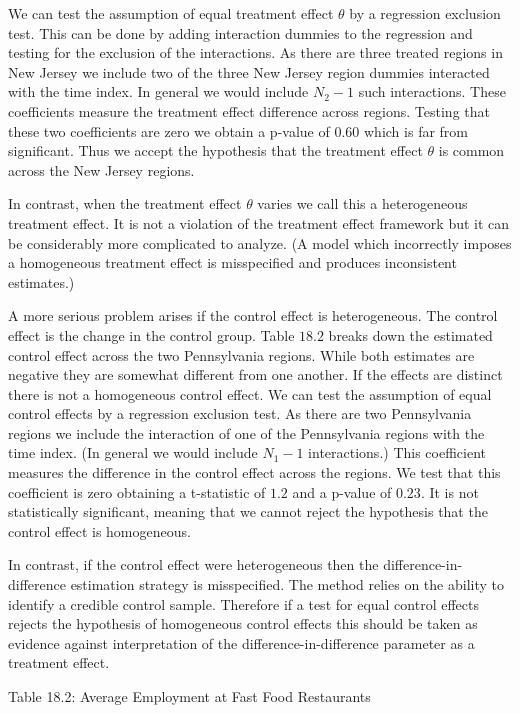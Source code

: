 \documentclass[10pt]{article}
\begin{document}
We can test the assumption of equal treatment effect $\theta$ by a regression exclusion test. This can be done by adding interaction dummies to the regression and testing for the exclusion of the interactions. As there are three treated regions in New Jersey we include two of the three New Jersey region dummies interacted with the time index. In general we would include $N_{2}-1$ such interactions. These coefficients measure the treatment effect difference across regions. Testing that these two coefficients are zero we obtain a p-value of $0.60$ which is far from significant. Thus we accept the hypothesis that the treatment effect $\theta$ is common across the New Jersey regions.

In contrast, when the treatment effect $\theta$ varies we call this a heterogeneous treatment effect. It is not a violation of the treatment effect framework but it can be considerably more complicated to analyze. (A model which incorrectly imposes a homogeneous treatment effect is misspecified and produces inconsistent estimates.)

A more serious problem arises if the control effect is heterogeneous. The control effect is the change in the control group. Table $18.2$ breaks down the estimated control effect across the two Pennsylvania regions. While both estimates are negative they are somewhat different from one another. If the effects are distinct there is not a homogeneous control effect. We can test the assumption of equal control effects by a regression exclusion test. As there are two Pennsylvania regions we include the interaction of one of the Pennsylvania regions with the time index. (In general we would include $N_{1}-1$ interactions.) This coefficient measures the difference in the control effect across the regions. We test that this coefficient is zero obtaining a t-statistic of $1.2$ and a p-value of $0.23$. It is not statistically significant, meaning that we cannot reject the hypothesis that the control effect is homogeneous.

In contrast, if the control effect were heterogeneous then the difference-in-difference estimation strategy is misspecified. The method relies on the ability to identify a credible control sample. Therefore if a test for equal control effects rejects the hypothesis of homogeneous control effects this should be taken as evidence against interpretation of the difference-in-difference parameter as a treatment effect.

Table 18.2: Average Employment at Fast Food Restaurants
\end{document}
